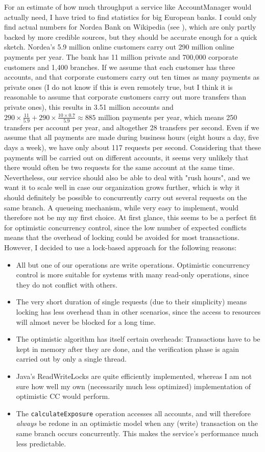 \documentclass[12pt,a4paper,fleqn]{article}
\begin{document}
For an estimate of how much throughput a service like AccountManager would actually need, I have tried to find statistics for big European banks. I could only find actual numbers for Nordea Bank on Wikipedia (see \cite{Wikipedia}), which are only partly backed by more credible sources, but they should be accurate enough for a quick sketch. Nordea's 5.9 million online customers carry out 290 million online payments per year. The bank has 11 million private and 700,000 corporate customers and 1,400 branches. If we assume that each customer has three accounts, and that corporate customers carry out ten times as many payments as private ones (I do not know if this is even remotely true, but I think it is reasonable to assume that corporate customers carry out more transfers than private ones), this results in 3.51 million accounts  and $290 \times \frac{11}{5.9} + 290 \times \frac{10 \times 0.7}{5.9} \approx  885$ million payments per year, which means 250 transfers per account per year, and altogether 28 transfers per second. Even if we assume that all payments are made during business hours (eight hours a day, five days a week), we have only about 117 requests per second. Considering that these payments will be carried out on different accounts, it seems very unlikely that there would often be two requests for the same account at the same time. 
Nevertheless, our service should also be able to deal with "rush hours", and we want it to scale well in case our organization grows further, which is why it should definitely be possible to concurrently carry out several requests on the same branch. A queueing mechanism, while very easy to implement, would therefore not be my my first choice. 
At first glance, this seems to be a perfect fit for optimistic concurrency control, since the low number of expected conflicts means that the overhead of locking could be avoided for most transactions. However, I decided to use a lock-based approach for the following reasons:
\begin{itemize}
  \item All but one of our operations are write operations. Optimistic concurrency control is more suitable for systems with many read-only operations, since they do not conflict with others.
  \item The very short duration of single requests (due to their simplicity) means locking has less overhead than in other scenarios, since the access to resources will almost never be blocked for a long time.
  \item The optimistic algorithm has itself certain overheads: Transactions have to be kept in memory after they are done, and the verification phase is again carried out by only a single thread. 
  \item Java's ReadWriteLocks are quite efficiently implemented, whereas I am not sure how well my own (necessarily much less optimized) implementation of optimistic CC would perform.
  \item The \texttt{calculateExposure} operation accesses all accounts, and will therefore \emph{always} be redone in an optimistic model when any (write) transaction on the same branch occurs concurrently. This makes the service's performance much less predictable.
\end{itemize}
\end{document}
